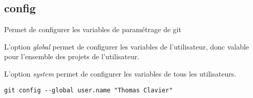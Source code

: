 \subsection*{config}

Permet de configurer les variables de paramétrage de git

L'option \textit{global} permet de configurer les variables de l'utilisateur, donc valable pour l'ensemble des projets de l'utilisateur.

L'option \textit{system} permet de configurer les variables de tous les utilisateurs.

\begin{verbatim}
git config --global user.name "Thomas Clavier"
\end{verbatim}

